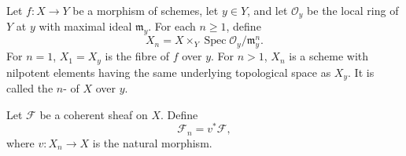Let $f: X \to Y$ be a morphism of schemes, let $y \in Y$, and let $\mathcal{O}_y$ be the local ring of $Y$ at $y$ with maximal ideal $\mathfrak{m}_y$. For each $n \geqslant 1$, define
$$
X_n = X \times_Y \operatorname{Spec} \mathcal{O}_y / \mathfrak{m}_y^n.
$$
For $n = 1$, $X_1 = X_y$ is the fibre of $f$ over $y$. For $n > 1$, $X_n$ is a scheme with nilpotent elements having the same underlying topological space as $X_y$. It is called the $n$- of $X$ over $y$.

Let $\mathcal{F}$ be a coherent sheaf on $X$. Define
$$
\mathcal{F}_n = v^*\mathcal{F},
$$
where $v: X_n \to X$ is the natural morphism.
